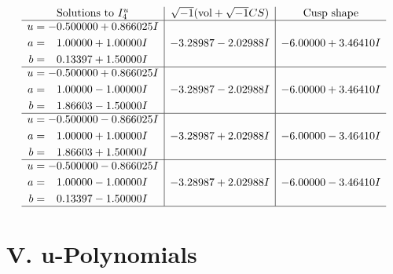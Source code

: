 \documentclass[1p]{elsarticle_modified}
\theoremstyle{definition}
\newcommand{\I}{\sqrt{-1}}
\begin{document}
$$\begin{array}{c|c|c}  
\text{Solutions to }I^u_{4}& \I (\text{vol} + \sqrt{-1}CS) & \text{Cusp shape}\\
 \hline 
\begin{aligned}
u &= -0.500000 + 0.866025 I \\
a &= \phantom{-}1.00000 + 1.00000 I \\
b &= \phantom{-}0.13397 + 1.50000 I\end{aligned}
 & -3.28987 - 2.02988 I & -6.00000 + 3.46410 I \\ \hline\begin{aligned}
u &= -0.500000 + 0.866025 I \\
a &= \phantom{-}1.00000 - 1.00000 I \\
b &= \phantom{-}1.86603 - 1.50000 I\end{aligned}
 & -3.28987 - 2.02988 I & -6.00000 + 3.46410 I \\ \hline\begin{aligned}
u &= -0.500000 - 0.866025 I \\
a &= \phantom{-}1.00000 + 1.00000 I \\
b &= \phantom{-}1.86603 + 1.50000 I\end{aligned}
 & -3.28987 + 2.02988 I & -6.00000 - 3.46410 I \\ \hline\begin{aligned}
u &= -0.500000 - 0.866025 I \\
a &= \phantom{-}1.00000 - 1.00000 I \\
b &= \phantom{-}0.13397 - 1.50000 I\end{aligned}
 & -3.28987 + 2.02988 I & -6.00000 - 3.46410 I\\
 \hline 
 \end{array}$$\newpage
\newpage\renewcommand{\arraystretch}{1}
\centering \section*{ V. u-Polynomials}
\end{document}
